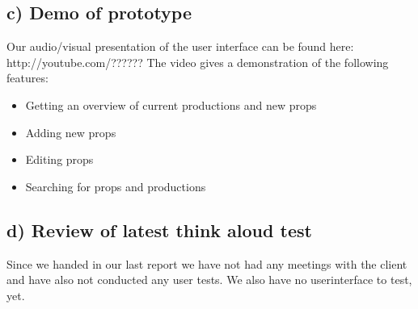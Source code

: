\documentclass[12pt]{article}
\begin{document}
\subsection{c) Demo of prototype}
Our audio/visual presentation of the user interface can be found here: http://youtube.com/??????
\newline
The video gives a demonstration of the following features:
\begin{itemize}
  \item Getting an overview of current productions and new props
  \item Adding new props
  \item Editing props
  \item Searching for props and productions
\end{itemize}
\subsection{d) Review of latest think aloud test}
Since we handed in our last report we have not had any meetings with the client and have also not conducted any user tests. We also have no userinterface to test, yet.
\end{document}

